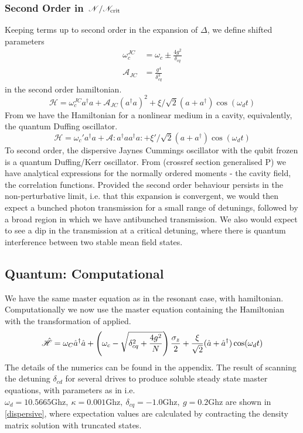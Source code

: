 \subsubsection{Second Order in $\flatfrac{\mathscr{N}}{\mathscr{N}_{\text{crit}}}$}
Keeping terms up to second order in the expansion of $\Delta$, we define shifted parameters
\begin{align*}
    \omega_c^{JC} &= \omega_c \pm \frac{4g^2}{\delta_{cq}}\\
    \mathscr{A}_{JC} &= \frac{g^4}{\delta_{cq}^3}
\end{align*}
in the second order hamiltonian. 
\begin{equation}
    \mathscr{H} = \omega_c^{JC} a ^ \dagger a
    + \mathscr{A}_{JC}\left(a^\dagger a\right)^2
    + \xi/\sqrt{2} ( a + a^\dagger ) \cos(\omega_d t)
\end{equation}
From \cite{Drummond1979} we have the Hamiltonian for a nonlinear medium in a cavity, equivalently, the quantum Duffing oscillator. 
\begin{equation}
    \mathscr{H} = \omega_c' a^\dagger a
    + \mathscr{A} : a ^ \dagger a a ^ \dagger a :
    + \xi'/\sqrt{2}(a+a^\dagger)\cos(\omega_d t)\label{duff}
\end{equation}
To second order, the dispersive Jaynes Cummings oscillator with the qubit frozen is a quantum Duffing/Kerr oscillator. 
From (crossref section generalised P) we have analytical expressions for the normally ordered moments - the cavity field, the correlation functions. 
Provided the second order behaviour persists in the non-perturbative limit, i.e. that this expansion is convergent, we would then expect a bunched photon transmission for a small range of detunings, followed by a broad region in which we have antibunched transmission.
We also would expect to see a dip in the transmission at a critical detuning, where there is quantum interference between two stable mean field states.
\subsection{Quantum: Computational}
We have the same master equation as in the resonant case, with hamiltonian. Computationally we now use the master equation containing the Hamiltonian with the transformation of  \cite{Carbonaro1979} applied.
\begin{equation}
  \hat{\mathscr{H}} = \omega_C {\hat{a}^\dagger} \hat{a} + \left(\omega_c - \sqrt{\delta_{cq}^2 + \frac{4g^2}{N}}\right)\frac{\sigma_z}{2} + \frac{\xi}{\sqrt{2}} ( \hat{a} + {\hat{a}^\dagger} ) \cos(\omega_d t) 
\end{equation}
The details of the numerics can be found in the appendix. 
The result of scanning the detuning $\delta_{cd}$ for several drives to produce soluble steady state master equations, with parameters as in \cite{Bishop2010} i.e. $\omega_d = 10.5665\text{Ghz}, \  \kappa = 0.001 \text{Ghz}, \  \delta_{cq} = -1.0 \text{Ghz}, \  g = 0.2\text{Ghz}$ are shown in \cref{dispersive}, where expectation values are calculated by contracting the density matrix solution with truncated states.
